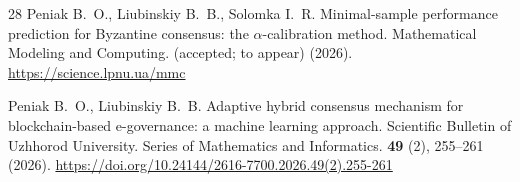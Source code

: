 \begin{thebibliography}{28}
Peniak B.~O., Liubinskiy B.~B., Solomka I.~R. Minimal-sample performance
prediction for Byzantine consensus: the $\alpha$-calibration method.
Mathematical Modeling and Computing. (accepted; to appear) (2026).
\url{https://science.lpnu.ua/mmc}

Peniak B.~O., Liubinskiy B.~B. Adaptive hybrid consensus mechanism for
blockchain-based \mbox{e-governance}: a machine learning approach. Scientific Bulletin
of Uzhhorod University. Series of Mathematics and Informatics. \textbf{49} (2),
255--261 (2026).
\url{https://doi.org/10.24144/2616-7700.2026.49(2).255-261}

\end{thebibliography}

